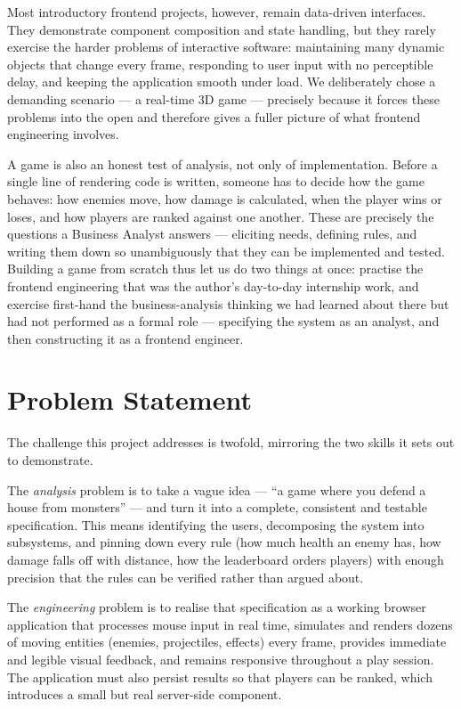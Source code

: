 Most introductory frontend projects, however, remain data-driven interfaces.
They demonstrate component composition and state handling, but they rarely
exercise the harder problems of interactive software: maintaining many dynamic
objects that change every frame, responding to user input with no perceptible
delay, and keeping the application smooth under load. We deliberately chose a
demanding scenario --- a real-time 3D game --- precisely because it forces these
problems into the open and therefore gives a fuller picture of what frontend
engineering involves.

A game is also an honest test of analysis, not only of implementation. Before a
single line of rendering code is written, someone has to decide how the game
behaves: how enemies move, how damage is calculated, when the player wins or
loses, and how players are ranked against one another. These are precisely the
questions a Business Analyst answers --- eliciting needs, defining rules, and
writing them down so unambiguously that they can be implemented and tested.
Building a game from scratch thus let us do two things at once: practise the
frontend engineering that was the author's day-to-day internship work, and
exercise first-hand the business-analysis thinking we had learned about there
but had not performed as a formal role --- specifying the system as an analyst,
and then constructing it as a frontend engineer.

\section{Problem Statement}

The challenge this project addresses is twofold, mirroring the two skills it
sets out to demonstrate.

The \emph{analysis} problem is to take a vague idea --- ``a game where you
defend a house from monsters'' --- and turn it into a complete, consistent and
testable specification. This means identifying the users, decomposing the
system into subsystems, and pinning down every rule (how much health an enemy
has, how damage falls off with distance, how the leaderboard orders players)
with enough precision that the rules can be verified rather than argued about.

The \emph{engineering} problem is to realise that specification as a working
browser application that processes mouse input in real time, simulates and
renders dozens of moving entities (enemies, projectiles, effects) every frame,
provides immediate and legible visual feedback, and remains responsive
throughout a play session. The application must also persist results so that
players can be ranked, which introduces a small but real server-side component.

